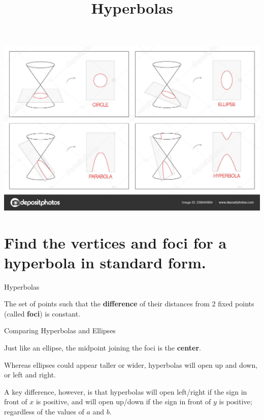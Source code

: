 \documentclass[t,dvipsnames,table]{beamer}
\title{Hyperbolas}
\author{}
\date{}
\begin{document}
\begin{frame} 
\maketitle
\end{frame}

\begin{frame}[c]
\includegraphics[scale=0.80]{Images/conics.jpg}
\end{frame}

\section{Find the vertices and foci for a hyperbola in standard form.}

\begin{frame}{Hyperbolas}
\begin{tcolorbox}[colback=red!10!white, colframe=red!60!black,, title=\textbf{Hyperbolas}]
The set of points such that the \textbf{difference} of their distances from 2 fixed points (called \textbf{foci}) is constant.
\end{tcolorbox}
\end{frame}

\begin{frame}{Comparing Hyperbolas and Ellipses}

Just like an ellipse, the midpoint joining the foci is the \textbf{center}.    \newline\\	\pause 

Whereas ellipses could appear taller or wider, hyperbolas will open up and down, or left and right. \newline\\ \pause 

A key difference, however, is that hyperbolas will open left/right if the sign in front of $x$ is positive, and will open up/down if the sign in front of $y$ is positive; regardless of the values of $a$ and $b$.
\end{frame}
\end{document}
